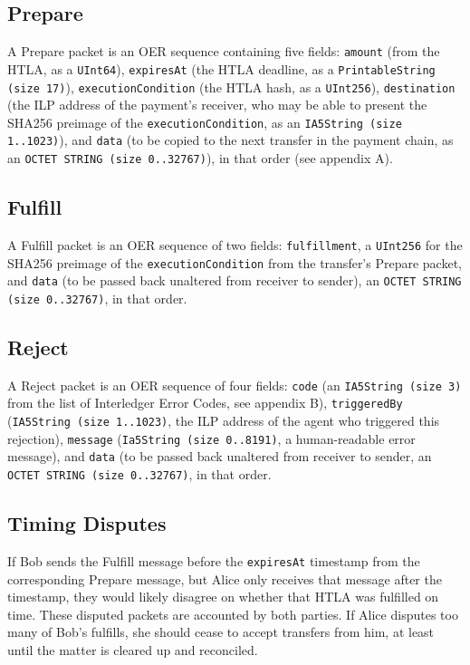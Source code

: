 \documentclass[11pt,twoside,a4paper]{article}
\begin{document}
\subsection{Prepare}
A Prepare packet is an OER sequence containing five fields:
{\tt amount} (from the HTLA, as a {\tt UInt64}),
{\tt expiresAt} (the HTLA deadline, as a {\tt PrintableString (size 17)}),
{\tt executionCondition} (the HTLA hash, as a {\tt UInt256}),
{\tt destination} (the ILP address of the payment's receiver, who may be able to present the SHA256 preimage of the {\tt executionCondition}, as an {\tt IA5String (size 1..1023)}), and
{\tt data} (to be copied to the next transfer in the payment chain, as an {\tt OCTET STRING (size 0..32767)}),
in that order (see appendix A).

\subsection{Fulfill}
A Fulfill packet is an OER sequence of two fields:
{\tt fulfillment}, a {\tt UInt256} for the SHA256 preimage of the {\tt executionCondition} from the transfer's Prepare packet,
and {\tt data} (to be passed back unaltered from receiver to sender), an {\tt OCTET STRING (size 0..32767)}, in that order.

\subsection{Reject}
A Reject packet is an OER sequence of four fields:
{\tt code} (an {\tt IA5String (size 3)} from the list of Interledger Error Codes, see appendix B),
{\tt triggeredBy} ({\tt IA5String (size 1..1023)}, the ILP address of the agent who triggered this rejection),
{\tt message} ({\tt Ia5String (size 0..8191)}, a human-readable error message),
and {\tt data} (to be passed back unaltered from receiver to sender, an {\tt OCTET STRING (size 0..32767)}, in that order.

\subsection{Timing Disputes}
If Bob sends the Fulfill message before the {\tt expiresAt} timestamp from the corresponding Prepare message, but Alice only receives that message after the
timestamp, they would likely disagree on whether that HTLA was fulfilled on time.
These disputed packets are accounted by both parties. If Alice disputes too many of Bob's fulfills, she should cease to accept transfers from him,
at least until the matter is cleared up and reconciled.
\end{document}
